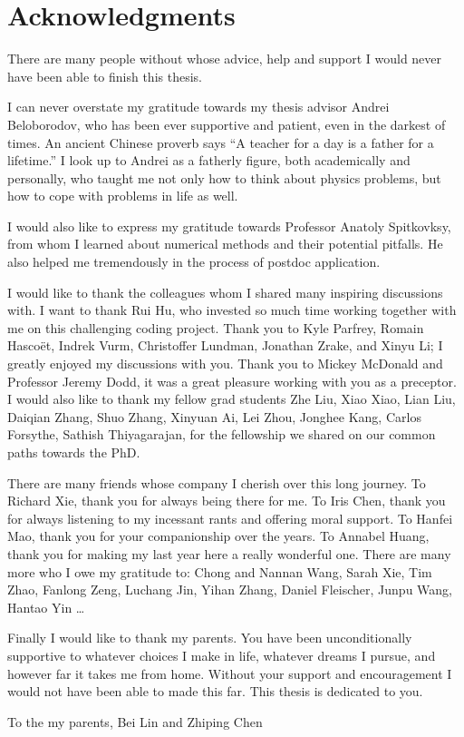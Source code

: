 \chapter*{Acknowledgments}
\label{chap:acknowledgments}

There are many people without whose advice, help and support I would never have
been able to finish this thesis.

I can never overstate my gratitude towards my thesis advisor Andrei Beloborodov,
who has been ever supportive and patient, even in the darkest of times. An
ancient Chinese proverb says ``A teacher for a day is a father for a lifetime.''
I look up to Andrei as a fatherly figure, both academically and personally, who
taught me not only how to think about physics problems, but how to cope with
problems in life as well.

I would also like to express my gratitude towards Professor Anatoly Spitkovksy,
from whom I learned about numerical methods and their potential pitfalls. He
also helped me tremendously in the process of postdoc application.

I would like to thank the colleagues whom I shared many inspiring discussions
with. I want to thank Rui Hu, who invested so much time working together with me
on this challenging coding project. Thank you to Kyle Parfrey, Romain Hascoët,
Indrek Vurm, Christoffer Lundman, Jonathan Zrake, and Xinyu Li; I greatly
enjoyed my discussions with you. Thank you to Mickey McDonald and Professor
Jeremy Dodd, it was a great pleasure working with you as a preceptor. I would
also like to thank my fellow grad students Zhe Liu, Xiao Xiao, Lian Liu, Daiqian
Zhang, Shuo Zhang, Xinyuan Ai, Lei Zhou, Jonghee Kang, Carlos Forsythe, Sathish
Thiyagarajan, for the fellowship we shared on our common paths towards the PhD.

There are many friends whose company I cherish over this long journey. To
Richard Xie, thank you for always being there for me. To Iris Chen, thank you
for always listening to my incessant rants and offering moral support. To Hanfei
Mao, thank you for your companionship over the years. To Annabel Huang, thank
you for making my last year here a really wonderful one. There are many more who
I owe my gratitude to: Chong and Nannan Wang, Sarah Xie, Tim Zhao, Fanlong Zeng,
Luchang Jin, Yihan Zhang, Daniel Fleischer, Junpu Wang, Hantao Yin \dots

Finally I would like to thank my parents. You have
been unconditionally supportive to whatever choices I make in life, whatever
dreams I pursue, and however far it takes me from home. Without your support and
encouragement I would not have been able to made this far. This thesis is
dedicated to you.

\newpage \vspace*{8cm}
\begin{center}
\large To the my parents, Bei Lin and Zhiping Chen
\end{center}

